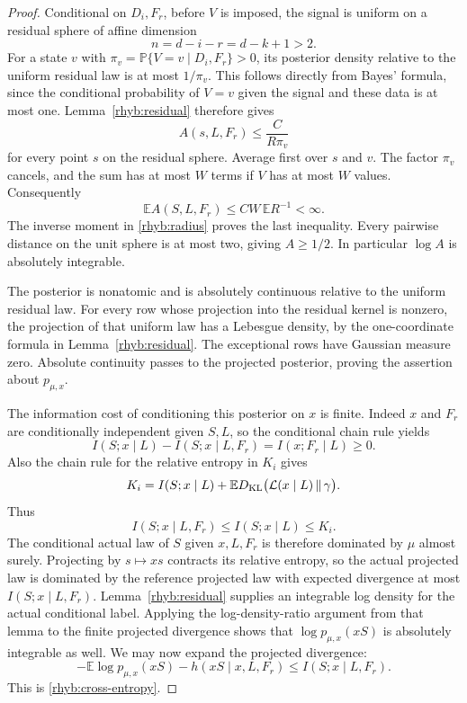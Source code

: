 \begin{proof}
Conditional on \(D_i,F_r\), before \(V\) is imposed, the signal is uniform
on a residual sphere of affine dimension
\[
 n=d-i-r=d-k+1>2.
\]
For a state \(v\) with
\(\pi_v=\mathbb P\{V=v\mid D_i,F_r\}>0\), its posterior density relative
to the uniform residual law is at most \(1/\pi_v\).  This follows directly
from Bayes' formula, since the conditional probability of \(V=v\) given
the signal and these data is at most one.  Lemma~\ref{rhyb:residual}
therefore gives
\[
 A(s,L,F_r)\le\frac{C}{R\pi_v}
\]
for every point \(s\) on the residual sphere.  Average first over \(s\)
and \(v\).  The factor \(\pi_v\) cancels, and the sum has at most \(W\)
terms if \(V\) has at most \(W\) values.  Consequently
\begin{equation}\label{rhyb:scale-integrability}
 \mathbb E A(S,L,F_r)\le CW\,\mathbb E R^{-1}<\infty.
\end{equation}
The inverse moment in \eqref{rhyb:radius} proves the last inequality.
Every pairwise distance on the unit sphere is at most two, giving
\(A\ge1/2\).  In particular \(\log A\) is absolutely integrable.

The posterior is nonatomic and is absolutely continuous relative to the
uniform residual law.  For every row whose projection into the residual
kernel is nonzero, the projection of that uniform law has a Lebesgue
density, by the one-coordinate formula in Lemma~\ref{rhyb:residual}.
The exceptional rows have Gaussian measure zero.  Absolute continuity
passes to the projected posterior, proving the assertion about
\(p_{\mu,x}\).

The information cost of conditioning this posterior on \(x\) is finite.
Indeed \(x\) and \(F_r\) are conditionally
independent given \(S,L\), so the conditional chain rule yields
\[
 I(S;x\mid L)-I(S;x\mid L,F_r)=I(x;F_r\mid L)\ge0.
\]
Also the chain rule for the relative entropy in \(K_i\) gives
\[
 K_i=I(S;x\mid L)+
 \mathbb E D_{\rm KL}\bigl(\mathcal L(x\mid L)\,\|\,\gamma\bigr).
\]
Thus
\begin{equation}\label{rhyb:information-charge}
 I(S;x\mid L,F_r)\le I(S;x\mid L)\le K_i.
\end{equation}
The conditional actual law of \(S\) given \(x,L,F_r\) is therefore dominated
by \(\mu\) almost surely.  Projecting by \(s\mapsto xs\) contracts its
relative entropy, so the actual projected law is dominated by the
reference projected law with expected divergence at most
\(I(S;x\mid L,F_r)\).  Lemma~\ref{rhyb:residual} supplies an integrable
log density for the actual conditional label.  Applying the
log-density-ratio argument from that lemma to the finite projected
divergence shows that \(\log p_{\mu,x}(xS)\) is absolutely integrable
as well.  We may now expand the projected divergence:
\[
 -\mathbb E\log p_{\mu,x}(xS)-h(xS\mid x,L,F_r)
 \le I(S;x\mid L,F_r).
\]
This is \eqref{rhyb:cross-entropy}.


\end{proof}
